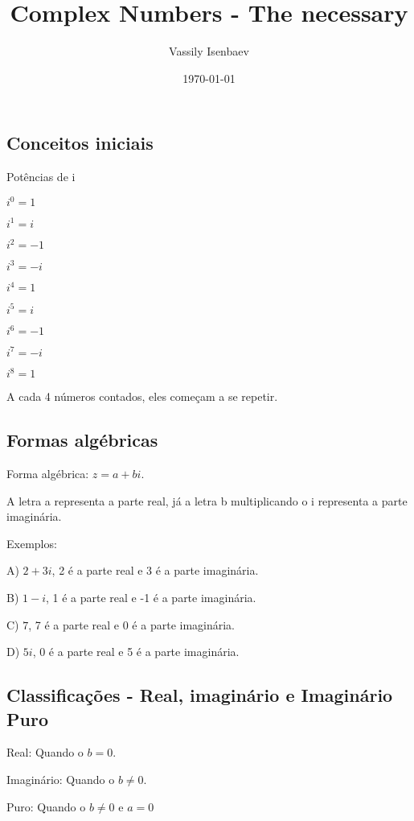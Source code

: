 \documentclass[]{article}
\title{Complex Numbers - The necessary}
\author{Vassily Isenbaev}
\date{\today}
\begin{document}
\maketitle
\begin{large}
\section{Conceitos iniciais}
\begin{flushleft}

Potências de i \vspace{.3cm}

$i^0 = 1$

$i^1 = i$

$i^2 = -1$

$i^3 = -i$

$i^4 = 1$

$i^5 = i$

$i^6 = -1$

$i^7 = -i$

$i^8 = 1$ \vspace{.3cm}

A cada 4 números contados, eles começam a se repetir.

\subsection{Formas algébricas}

Forma algébrica: $z=a+bi$.

A letra a representa a parte real, já a letra b multiplicando o i representa a parte imaginária.

Exemplos: \vspace{.3cm}

A) $2+3i$, 2 é a parte real e 3 é a parte imaginária.

B) $1-i$, 1 é a parte real e -1 é a parte imaginária.

C) $7$, 7 é a parte real e 0 é a parte imaginária.

D) $5i$, 0 é a parte real e 5 é a parte imaginária.

\subsection{Classificações - Real, imaginário e Imaginário Puro}

Real: Quando o $b = 0$.

Imaginário: Quando o $b \not= 0$.

Puro: Quando o $b \not= 0$ e $a = 0$


\end{flushleft}
\end{large}
\end{document}
